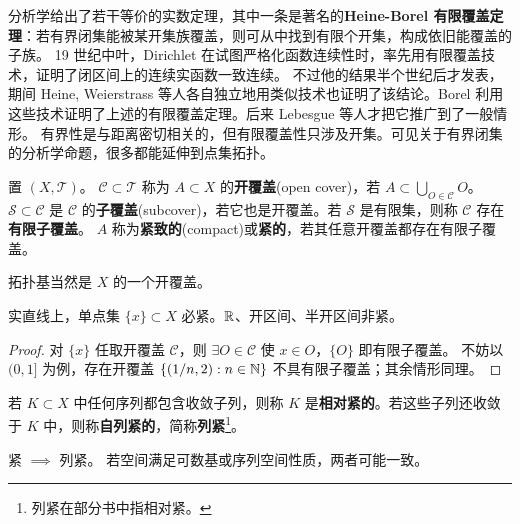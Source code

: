 分析学给出了若干等价的实数定理，其中一条是著名的\textbf{Heine-Borel 有限覆盖定理}：若有界闭集能被某开集族覆盖，则可从中找到有限个开集，构成依旧能覆盖的子族。
19 世纪中叶，Dirichlet 在试图严格化函数连续性时，率先用有限覆盖技术，证明了闭区间上的连续实函数一致连续。
不过他的结果半个世纪后才发表，期间 Heine, Weierstrass 等人各自独立地用类似技术也证明了该结论。Borel 利用这些技术证明了上述的有限覆盖定理。后来 Lebesgue 等人才把它推广到了一般情形。
有界性是与距离密切相关的，但有限覆盖性只涉及开集。可见关于有界闭集的分析学命题，很多都能延伸到点集拓扑。

\begin{definition}
    置 $(X,\mathscr T)$。
    $\mathscr C\subset\mathscr T$ 称为 $A\subset X$ 的\textbf{开覆盖}(open cover)，若 $A\subset\bigcup_{O\in\mathscr C}O$。
    $\mathscr S\subset\mathscr C$ 是 $\mathscr C$ 的\textbf{子覆盖}(subcover)，若它也是开覆盖。若 $\mathscr S$ 是有限集，则称 $\mathscr C$ 存在\textbf{有限子覆盖}。
    $A$ 称为\textbf{紧致的}(compact)或\textbf{紧的}，若其任意开覆盖都存在有限子覆盖。
\end{definition}

\begin{eg}
    拓扑基当然是 $X$ 的一个开覆盖。
\end{eg}

\begin{eg}
    实直线上，单点集 $\{x\}\subset X$ 必紧。$\mathbb{R}$、开区间、半开区间非紧。
\end{eg}
\begin{proof}
    对 $\{x\}$ 任取开覆盖 $\mathscr C$，则 $\exists O\in\mathscr C$ 使 $x\in O$，$\{O\}$ 即有限子覆盖。
    不妨以 $(0,1]$ 为例，存在开覆盖 $\{(1/n,2):n\in\mathbb{N}\}$ 不具有限子覆盖；其余情形同理。
\end{proof}

\begin{definition}
    若 $K\subset X$ 中任何序列都包含收敛子列，则称 $K$ 是\textbf{相对紧的}。若这些子列还收敛于 $K$ 中，则称\textbf{自列紧的}，简称\textbf{列紧}\footnote{列紧在部分书中指相对紧。}。
\end{definition}

\begin{remark}
    紧 $\implies$ 列紧。
    若空间满足可数基或序列空间性质，两者可能一致。
\end{remark}

